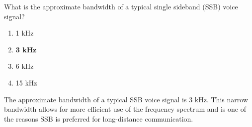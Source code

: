 \begin{tcolorbox}[colback=gray!10!white,colframe=black!75!black,title={T8A08}]
    What is the approximate bandwidth of a typical single sideband (SSB) voice signal?
    \begin{enumerate}[label=\Alph*),noitemsep]
        \item 1 kHz
        \item \textbf{3 kHz}
        \item 6 kHz
        \item 15 kHz
    \end{enumerate}
\end{tcolorbox}
The approximate bandwidth of a typical SSB voice signal is 3 kHz. This narrow bandwidth allows for more efficient use of the frequency spectrum and is one of the reasons SSB is preferred for long-distance communication.
